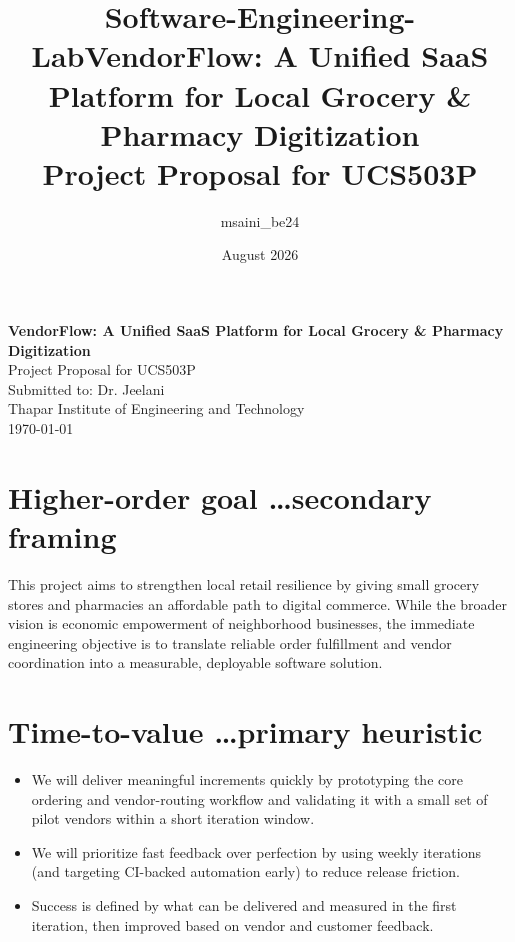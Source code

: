\documentclass{article}
\title{Software-Engineering-Lab}
\author{msaini_be24 }
\date{August 2026}
\title{\textbf{VendorFlow: A Unified SaaS Platform for Local Grocery \& Pharmacy Digitization} \\
\large Project Proposal for UCS503P}
\author{}
\date{}
\begin{document}
\begin{center}
    {\LARGE \textbf{VendorFlow: A Unified SaaS Platform for Local Grocery \& Pharmacy Digitization}}\\[0.3cm]
    {\large Project Proposal for UCS503P}\\[0.3cm]
    Submitted to: Dr. Jeelani\\
    Thapar Institute of Engineering and Technology\\[0.3cm]
    \today
\end{center}

\vspace{0.5cm}

\section{Higher-order goal \dots secondary framing}
This project aims to strengthen local retail resilience by giving small grocery stores and pharmacies
an affordable path to digital commerce. While the broader vision is economic empowerment of
neighborhood businesses, the immediate engineering objective is to translate reliable order
fulfillment and vendor coordination into a measurable, deployable software solution.

\section{Time-to-value \dots primary heuristic}
\begin{itemize}
    \item We will deliver meaningful increments quickly by prototyping the core ordering and
    vendor-routing workflow and validating it with a small set of pilot vendors within a short
    iteration window.
    \item We will prioritize fast feedback over perfection by using weekly iterations (and
    targeting CI-backed automation early) to reduce release friction.
    \item Success is defined by what can be delivered and measured in the first iteration, then
    improved based on vendor and customer feedback.
\end{itemize}
\end{document}
